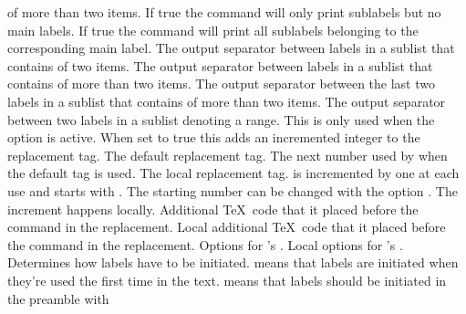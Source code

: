 \documentclass[load-preamble+,ngerman,british,american]{cnltx-doc}
\begin{document}
\begin{options}
    of more than two items.
    If true the command  will only print sublabels but no main
    labels.
    If true the command  will print all sublabels belonging to the
    corresponding main label.
  \Default{,}
    The output separator between labels in a sublist that contains of two
    items.
  \Default{,}
    The output separator between labels in a sublist that contains of more
    than two items.
  \Default{,}
    The output separator between the last two labels in a sublist that
    contains of more than two items.
  \Default{--}
    The output separator between two labels in a sublist denoting a range.
    This is only used when the option  is active.
    When set to true this adds an incremented integer to the replacement tag.
    The default replacement tag.
    The next number used by  when the
    default tag is used.
    The local replacement tag.   is incremented by one at each
    use and starts with .  The starting number can be changed with the
    option .  The increment happens locally.
    Additional \TeX\ code that it placed before the  command in the
    replacement.
    Local additional \TeX\ code that it placed before the  command in
    the replacement.
    Options for 's .
    Local options for 's .
    Determines how labels have to be initiated.   means that
    labels are initiated when they're used the first time in the text.
     means that labels should be initiated in the preamble with

\end{options}
\end{document}

